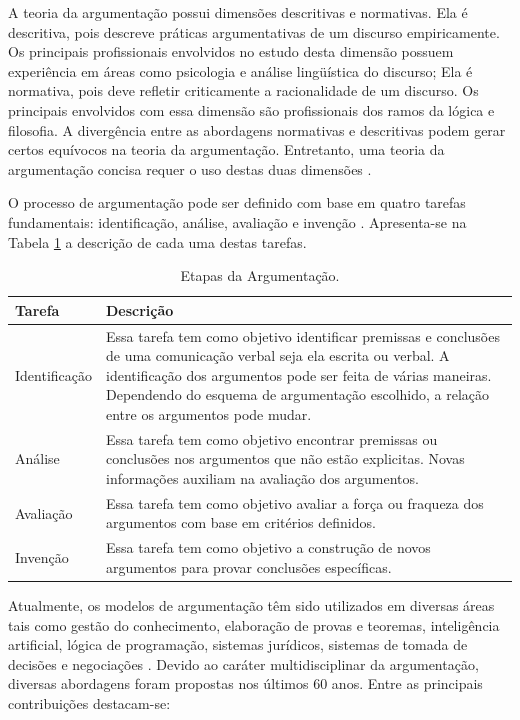 A teoria da argumentação possui dimensões descritivas e normativas. Ela é descritiva, pois descreve práticas argumentativas de um discurso empiricamente. Os principais profissionais envolvidos no estudo desta dimensão possuem experiência em áreas como psicologia e análise lingüística do discurso; Ela é normativa, pois deve refletir criticamente a racionalidade de um discurso. Os principais envolvidos com essa dimensão são profissionais dos ramos da lógica e filosofia. A divergência entre as abordagens normativas e descritivas podem gerar certos equívocos na teoria da argumentação. Entretanto, uma teoria da argumentação concisa requer o uso destas duas dimensões \cite{eemeren1996argumentation}.

O processo de argumentação pode ser definido com base em quatro tarefas fundamentais: identificação, análise, avaliação e invenção \cite{walton2009intro}. Apresenta-se na Tabela \ref{tab-etapas-arg} a descrição de cada uma destas tarefas.

\begin{table}[H]
\caption{Etapas da Argumentação.}
\begin{center}
    \begin{tabular}{ | p{5cm} | p{9cm} |}
    \hline
    \textbf{Tarefa} & \textbf{Descrição} \\ \hline
    Identificação & Essa tarefa tem como objetivo identificar premissas e conclusões de uma comunicação verbal seja ela escrita ou verbal. A identificação dos argumentos pode ser feita de várias maneiras. Dependendo do esquema de argumentação escolhido, a relação entre os argumentos pode mudar. \\ \hline
    Análise & Essa tarefa tem como objetivo encontrar premissas ou conclusões nos argumentos que não estão explicitas. Novas informações auxiliam na avaliação dos argumentos. \\ \hline
    Avaliação & Essa tarefa tem como objetivo avaliar a força ou fraqueza dos argumentos com base em critérios definidos. \\ \hline
    Invenção & Essa tarefa tem como objetivo a construção de novos argumentos para provar conclusões específicas. \\ \hline
    \end{tabular}
    \label{tab-etapas-arg}
\end{center}
\end{table}

Atualmente, os modelos de argumentação têm sido utilizados em diversas áreas tais como gestão do conhecimento, elaboração de provas e teoremas, inteligência artificial, lógica de programação, sistemas jurídicos, sistemas de tomada de decisões e negociações \cite{bentahar2010taxonomy}. Devido ao caráter multidisciplinar da argumentação, diversas abordagens foram propostas nos últimos 60 anos. Entre as principais contribuições destacam-se: 

